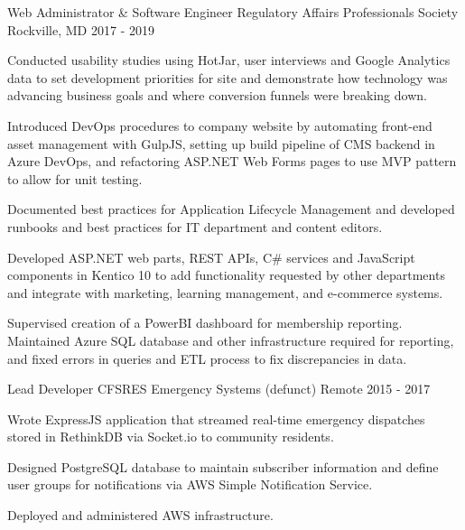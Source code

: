 \begin{cventries}
  \cventry
    {Web Administrator \& Software Engineer} %
    {Regulatory Affairs Professionals Society} %
    {Rockville, MD} %
    {2017 - 2019} %
    {
      \begin{cvitems} %
        \item {Conducted usability studies using HotJar, user interviews and Google Analytics data to set development priorities for site and demonstrate how technology was advancing business goals and where conversion funnels were breaking down.}
        \item {Introduced DevOps procedures to company website by automating front-end asset management with GulpJS, setting up build pipeline of CMS backend in Azure DevOps, and refactoring ASP.NET Web Forms pages to use MVP pattern to allow for unit testing.}
         \item {Documented best practices for Application Lifecycle Management and developed runbooks and best practices for IT department and content editors.}
         \item {Developed ASP.NET web parts, REST APIs, C\# services and JavaScript components in Kentico 10 to add functionality requested by other departments and integrate with marketing, learning management, and e-commerce systems.}
        \item {Supervised creation of a PowerBI dashboard for membership reporting. Maintained Azure SQL database and other infrastructure required for reporting, and fixed errors in queries and ETL process to fix discrepancies in data.}
      \end{cvitems}
    }

  \cventry
    {Lead Developer} %
    {CFSRES Emergency Systems (defunct)} %
    {Remote} %
    {2015 - 2017} %
    {
      \begin{cvitems} %
        \item {Wrote ExpressJS application that streamed real-time emergency dispatches stored in RethinkDB via Socket.io to community residents.}
        \item {Designed PostgreSQL database to maintain subscriber information and define user groups for notifications via AWS Simple Notification Service.}
        \item {Deployed and administered AWS infrastructure.}
      \end{cvitems}
    }


\end{cventries}

